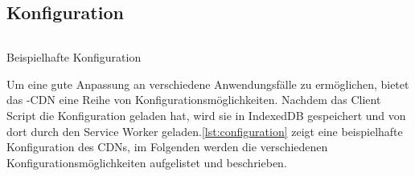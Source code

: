 \begin{description}

%



\section{Konfiguration}\label{i:Konfiguration}
\begin{listing}[h]
	\inputminted{javascript}{listings/configuration.js}
	\caption{Beispielhafte Konfiguration}
	\label{lst:configuration}
\end{listing}

Um eine gute Anpassung an verschiedene Anwendungsfälle zu ermöglichen, bietet das \pTp-CDN eine Reihe von Konfigurationsmöglichkeiten. Nachdem das Client Script die Konfiguration geladen hat, wird sie in IndexedDB gespeichert und von dort durch den Service Worker geladen.\ref{lst:configuration} zeigt eine beispielhafte Konfiguration des CDNs, im Folgenden werden die verschiedenen Konfigurationsmöglichkeiten aufgelistet und beschrieben.


\end{description}
